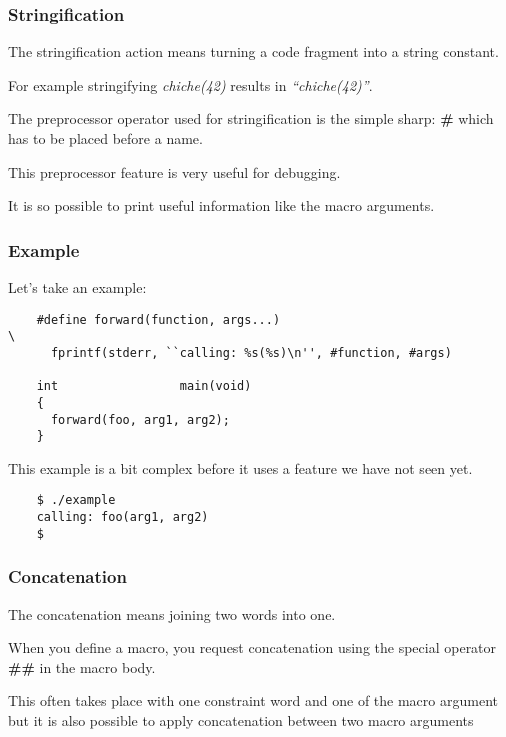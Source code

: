 \documentclass[9pt]{beamer}
\newcommand{\nl}[0]{\vspace{0.4cm}}
\begin{document}

\begin{frame}
  \frametitle{Stringification}

  The stringification action means turning a code fragment into
  a string constant.

  \nl

  For example stringifying \textit{chiche(42)} results in
  \textit{``chiche(42)''}.

  \nl

  The preprocessor operator used for stringification is the simple sharp:
  \textbf{\#} which has to be placed before a name.

  \nl

  This preprocessor feature is very useful for debugging.

  \nl

  It is so possible to print useful information like the macro arguments.
\end{frame}


\begin{frame}[containsverbatim]
  \frametitle{Example}

  Let's take an example:

  \begin{verbatim}
    #define forward(function, args...)                                  \
      fprintf(stderr, ``calling: %s(%s)\n'', #function, #args)

    int                 main(void)
    {
      forward(foo, arg1, arg2);
    }
  \end{verbatim}

  This example is a bit complex before it uses a feature we have not seen
  yet.

  \begin{verbatim}
    $ ./example
    calling: foo(arg1, arg2)
    $ 
  \end{verbatim}
\end{frame}


\begin{frame}
  \frametitle{Concatenation}

  The concatenation means joining two words into one.

  \nl

  When you define a macro, you request concatenation using the special
  operator \textbf{\#\#} in the macro body.

  \nl

  This often takes place with one constraint word and one of the macro
  argument but it is also possible to apply concatenation between two
  macro arguments
\end{frame}
\end{document}

